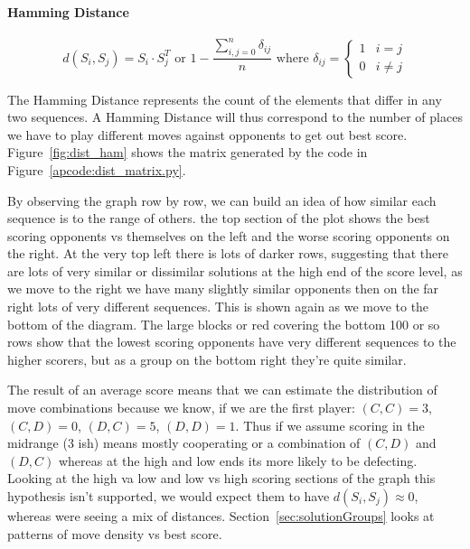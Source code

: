 \paragraph{Hamming Distance}
$$d(S_i,S_j) = S_i \cdot S_j^T \text{ or } 1-\frac{\sum^n_{i,j=0}\delta_{ij}}{n}\text{ where } \delta_{ij} = \begin{cases} 
    1 & i=j \\
    0 & i\ne j 
\end{cases} $$

The Hamming Distance represents the count of the elements that differ in any two sequences. 
A Hamming Distance will thus correspond to the number of places we have to play different moves against opponents to get out best score. 
Figure~\ref{fig:dist_ham} shows the matrix generated by the code in Figure~\ref{apcode:dist_matrix.py}.

By observing the graph row by row, we can build an idea of how similar each sequence is to the range of others.
the top section of the plot shows the best scoring opponents vs themselves on the left and the worse scoring opponents on the right. 
At the very top  left there is lots of darker rows, suggesting that there are lots of very similar or dissimilar solutions at the high end of the score level, as we move to the right we have many slightly similar opponents then on the far right lots of very different sequences.
This is shown again as we move to the bottom of the diagram.
The large blocks or red covering the bottom  100 or so rows show that the lowest scoring opponents have very different sequences to the higher scorers, but as a group on the bottom right they're quite similar.

The result of an average score means that we can estimate the distribution of move combinations because we know, if we are the first player: $(C,C)=3$, $(C,D)=0$, $(D,C)=5$, $(D,D)=1$.
Thus if we assume scoring in the midrange ($3$ ish) means mostly cooperating or a combination of $(C,D)$ and $(D,C)$ whereas at the high and low ends its more likely to be defecting.
Looking at the high va low and low vs high scoring sections of the graph this hypothesis isn't supported, we would expect them to have $d(S_i,S_j)\approx 0$, whereas were seeing a mix of distances. 
Section~\ref{sec:solutionGroups} looks at patterns of move density vs best score.

